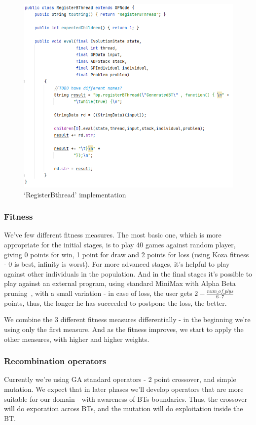 \documentclass{article}
\begin{document}
\begin{figure}[h]
    \includegraphics[width=\textwidth]{ecj-bt}
    \caption{`RegisterBthread' implementation}
    \label{fig:ecjc-bt}
\end{figure}


\subsubsection{Fitness}
We've few different fitness measures. The most basic one, which is more appropriate for the initial stages, is to play
40 games against random player,
giving 0 points for win, 1 point for draw and 2 points for loss (using Koza fitness - 0 is best, infinity is
worst).
For more advanced stages, it's helpful to play against other individuals in the population.
And in the final stages it's possible to play against an external program, using standard MiniMax with Alpha Beta
pruning~\cite{Scott}, with a small variation - in case of loss, the user gets \(2-\frac{num\_of\_plys}{6\cdot 7}\)
points, thus, the longer he has succeeded to postpone the loss, the better.

We combine the 3 different fitness measures differentially - in the beginning we're using only the first measure. And
as the fitness improves, we start to apply the other measures, with higher and higher weights.

\subsubsection{Recombination operators}
Currently we're using GA standard operators - 2 point crossover, and simple mutation.
We expect that in later phases we'll develop operators that are more suitable for our domain - with awareness
of BTs boundaries. Thus, the crossover will do exporation across BTs, and the mutation will do exploitation inside
the BT.


\printbibliography
\end{document}

